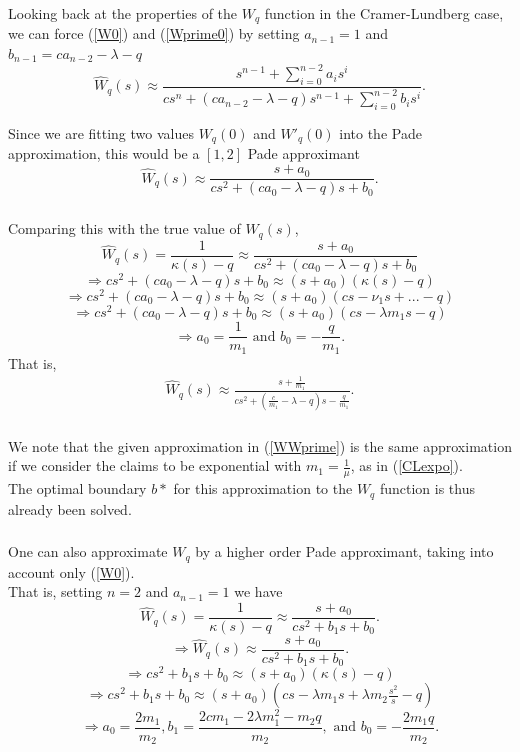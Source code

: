 \documentclass[xcolor=pdftex,dvipsnames,table]{beamer}
\theoremstyle{definition}
\begin{document}
\begin{frame}
\frametitle{\insertsectionhead}
\framesubtitle{\insertsubsectionhead}
Looking back at the properties of the $W_q$ function in the Cramer-Lundberg case, we can force (\ref{W0}) and (\ref{Wprime0}) by setting $a_{n-1}=1$ and $ b_{n-1} = ca_{n-2} -\lambda - q$
\[
\hat{W}_q(s) \approx \frac{s^{n-1} + \sum_{i=0}^{n-2} a_i s^i}{cs^n + (c a_{n-2} -\lambda - q) s^{n-1} +\sum_{i=0}^{n-2} b_i s^i}.
\]

Since we are fitting two values $W_q(0)$ and $W'_q(0)$ into the Pade approximation, this would be a $[1,2]$ Pade approximant
\[
\hat{W}_q(s) \approx \frac{s + a_0}{cs^2 + (c a_0 -\lambda - q) s +b_0}.
\]
\end{frame}

\begin{frame}
\frametitle{\insertsectionhead}
\framesubtitle{\insertsubsectionhead}
Comparing this with the true value of $\hat{W}_q(s)$,
\[
\hat{W}_q(s) = \frac{1}{\kappa(s)-q} \approx \frac{s + a_0}{cs^2 + (c a_0 -\lambda - q) s +b_0}
\]
\[
\Rightarrow cs^2 +(c a_0 -\lambda - q) s +b_0 \approx (s + a_0)(\kappa(s)-q)
\]
\[
\Rightarrow cs^2 +(c a_0 -\lambda - q) s +b_0 \approx (s + a_0)(cs -\nu_1 s +... -q)
\]
\[
\Rightarrow cs^2 +(c a_0 -\lambda - q) s +b_0 \approx (s + a_0)(cs -\lambda m_1 s  -q)
\]
\[
\Rightarrow a_0 = \frac{1}{m_1} \text{ and } b_0 = -\frac{q}{m_1}.
\]
That is,
\begin{align}
\label{WWprime}
\hat{W}_q(s) \approx \frac{s +  \frac{1}{m_1}}{cs^2 + ( \frac{c}{m_1} -\lambda - q) s -\frac{q}{m_1}}.
\end{align}
\end{frame}

\begin{frame}
\frametitle{\insertsectionhead}
We note that the given approximation in (\ref{WWprime}) is the same approximation if we consider the claims to be exponential with $m_1 = \frac{1}{\mu}$, as in (\ref{CLexpo}).\\
\bigskip
The optimal boundary $b*$ for this approximation to the $W_q$ function is thus already been solved.
\end{frame}

\begin{frame}
\frametitle{\insertsectionhead}
\framesubtitle{\insertsubsectionhead}
One can also approximate $W_q$ by a higher order Pade approximant, taking into account only (\ref{W0}).\\
That is, setting $n=2$ and $a_{n-1} = 1$ we have
\[
\hat{W}_q(s) = \frac{1}{\kappa(s)-q} \approx \frac{s + a_0}{cs^2 + b_1 s + b_0}.
\]
\[
\Rightarrow \hat{W}_q(s) \approx \frac{s + a_0}{cs^2 + b_1 s + b_0}.
\]
\[
\Rightarrow cs^2 +b_1 s +b_0 \approx (s + a_0)(\kappa(s)-q)
\]
\[
\Rightarrow cs^2 +b_1 s +b_0 \approx (s + a_0)(cs - \lambda m_1 s + \lambda m_2 \tfrac{s^2}{s} - q)
\]
\[
\Rightarrow a_0 = \frac{2m_1}{m_2}, b_1 = \frac{2c m_1 - 2\lambda m_1^2 - m_2 q}{m_2}, \text{ and } b_0 = -\frac{2m_1 q}{m_2}.
\]
\end{frame}
\end{document}
